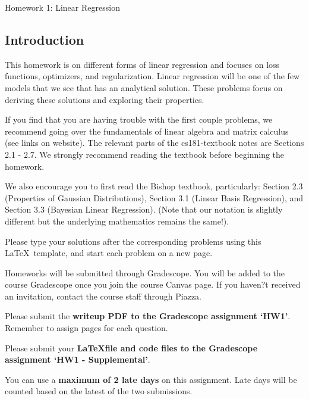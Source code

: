 \documentclass[submit]{harvardml}
\begin{document}
\begin{center}
{\Large Homework 1: Linear Regression}\\
\end{center}

\subsection*{Introduction}
This homework is on different forms of linear regression and focuses
on loss functions, optimizers, and regularization. Linear regression 
will be one of the few models that we see that has an analytical solution.
These problems focus on deriving these solutions and exploring their 
properties. 

If you find that you are having trouble with the first couple
problems, we recommend going over the fundamentals of linear algebra
and matrix calculus (see links on website).  The relevant parts of the
cs181-textbook notes are Sections 2.1 - 2.7.  We strongly recommend reading the textbook before beginning the homework.

We also encourage you to first read the Bishop
textbook, particularly: Section 2.3 (Properties of Gaussian
Distributions), Section 3.1 (Linear Basis Regression), and Section 3.3
(Bayesian Linear Regression). (Note that our notation is slightly different but
the underlying mathematics remains the same!).

Please type your solutions after the corresponding problems using this
\LaTeX\ template, and start each problem on a new page.

Homeworks will be submitted through Gradescope. You will be added to the course Gradescope once you join the course Canvas page. If you haven?t received an invitation, contact the course staff through Piazza.

Please submit the \textbf{writeup PDF to the Gradescope assignment `HW1'}. Remember to assign pages for each question. 

Please submit your \textbf{\LaTeX file and code files to the Gradescope assignment `HW1 - Supplemental'}. 

You can use a \textbf{maximum of 2 late days} on this assignment.  Late days will be counted based on the latest of the two submissions.
\\

\end{document}
